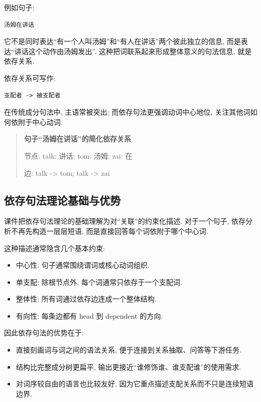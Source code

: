 例如句子:

\begin{Verbatim}[breaklines=true,breakanywhere=true,fontsize=\small]
汤姆在讲话
\end{Verbatim}

它不是同时表达“有一个人叫汤姆”和“有人在讲话”两个彼此独立的信息,
而是表达“讲话这个动作由汤姆发出”.
这种把词联系起来形成整体意义的句法信息, 就是依存关系.

依存关系可写作:

\begin{Verbatim}[breaklines=true,breakanywhere=true,fontsize=\small]
支配者 -> 被支配者
\end{Verbatim}

在传统成分句法中, 主语常被突出;
而依存句法更强调动词中心地位, 关注其他词如何依附于中心动词.

\begin{quote}
\small
\textbf{句子“汤姆在讲话”的简化依存关系}
\par 节点: talk: 讲话; tom: 汤姆; zai: 在
\par 边: talk -\textgreater{} tom; talk -\textgreater{} zai
\end{quote}

\subsection{依存句法理论基础与优势}


课件把依存句法理论的基础理解为对“关联”的约束化描述.
对于一个句子, 依存分析不再先构造一层层短语, 而是直接回答每个词依附于哪个中心词.

这种描述通常隐含几个基本约束:

\begin{itemize}
\item 中心性: 句子通常围绕谓词或核心动词组织.
\item 单支配: 除根节点外, 每个词通常只依存于一个支配词.
\item 整体性: 所有词通过依存边连成一个整体结构.
\item 有向性: 每条边都有 head 到 dependent 的方向.
\end{itemize}

因此依存句法的优势在于:

\begin{itemize}
\item 直接刻画词与词之间的语法关系, 便于连接到关系抽取、问答等下游任务.
\item 结构比完整成分树更扁平, 输出更接近“谁修饰谁、谁支配谁”的使用需求.
\item 对词序较自由的语言也比较友好, 因为它重点描述支配关系而不只是连续短语边界.
\end{itemize}

